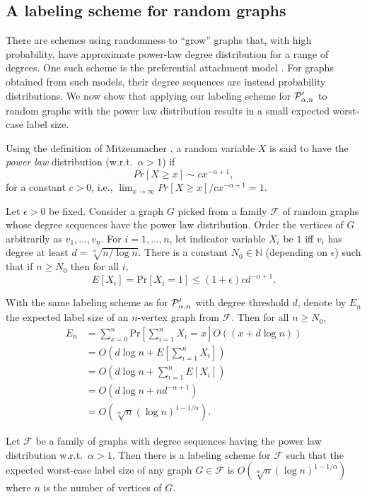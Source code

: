 \subsection{A labeling scheme for random graphs}
There are schemes using randomness to ``grow''  graphs that, with high probability, have approximate power-law degree distribution for a range of degrees. One such scheme is the preferential attachment model \cite{barabasi1999emergence}. For graphs obtained from such models, their degree sequences are instead probability distributions. We now show that applying our labeling scheme for $ \mathcal{P}'_{\alpha,n}$ to random graphs with the power law distribution results in a small expected worst-case label size.

Using the definition of Mitzenmacher \cite{mitzenmacher2004brief}, a random variable $X$ is said to have the \emph{power law} distribution (w.r.t.~$\alpha > 1$) if
\[
  Pr[X\geq x] \sim cx^{-\alpha+1},
\]
for a constant $c > 0$, i.e., $\lim_{x\to\infty}Pr[X\geq x]/cx^{-\alpha+1} = 1$.

Let $\epsilon > 0$ be fixed. Consider a graph $G$ picked from a family $\mathcal F$ of random graphs whose degree sequences have the power law distribution. Order the vertices of $G$ arbitrarily as $v_1,\ldots,v_n$. For $i=1,\ldots,n$, let indicator variable $X_i$ be $1$ iff $v_i$ has degree at least $d = \sqrt[\alpha]{n/\log n}$. There is a constant $N_0\in\mathbb N$ (depending on $\epsilon$) such that if $n\geq N_0$ then for all $i$,
\[
  E[X_i] = \mbox{Pr}[X_i = 1]\leq (1+\epsilon)cd^{-\alpha+1}.
\]

With the same labeling scheme as for $ \mathcal{P}'_{\alpha,n}$ with degree threshold $d$, denote by $E_n$ the expected label size of an $n$-vertex graph from $\mathcal F$. Then for all $n\geq N_0$,
\begin{align*}
  E_n & = \sum_{x=0}^n \mbox{Pr}\left[\sum_{i=1}^n X_i = x\right]O((x+d\log n))\\
                       & = O\left(d\log n + E\left[\sum_{i=1}^n X_i\right]\right)\\
                       & = O\left(d\log n + \sum_{i=1}^n E[X_i]\right)\\
                       & = O\left(d\log n + nd^{-\alpha+1}\right)\\
                       & = O\left(\sqrt[\alpha]n(\log n)^{1-1/\alpha}\right).
\end{align*}
\begin{theorem}\label{th:random}
Let $\mathcal F$ be a family of graphs with degree sequences having the power law distribution w.r.t.~$\alpha > 1$. Then there is a labeling scheme for $\mathcal F$ such that the expected worst-case label size of any graph $G\in\mathcal F$ is $O(\sqrt[\alpha]n(\log n)^{1-1/\alpha})$ where $n$ is the number of vertices of $G$.
\end{theorem}
